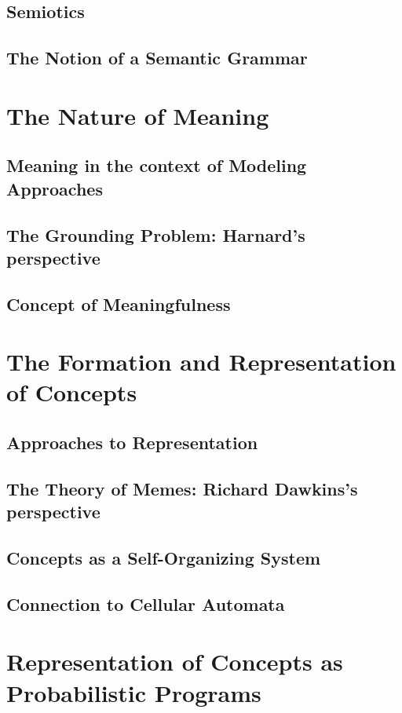\documentclass[twocolumn]{article}
\begin{document}
\subsection{Semiotics}
\subsection{The Notion of a Semantic Grammar}

\section{The Nature of Meaning}
\subsection{Meaning in the context of Modeling Approaches}
\subsection{The Grounding Problem: Harnard's perspective}
\subsection{Concept of Meaningfulness}

\section{The Formation and Representation of Concepts}
\subsection{Approaches to Representation}
\subsection{The Theory of Memes: Richard Dawkins's perspective}
\subsection{Concepts as a Self-Organizing System}
\subsection{Connection to Cellular Automata}

\section{Representation of Concepts as Probabilistic Programs}
\end{document}
